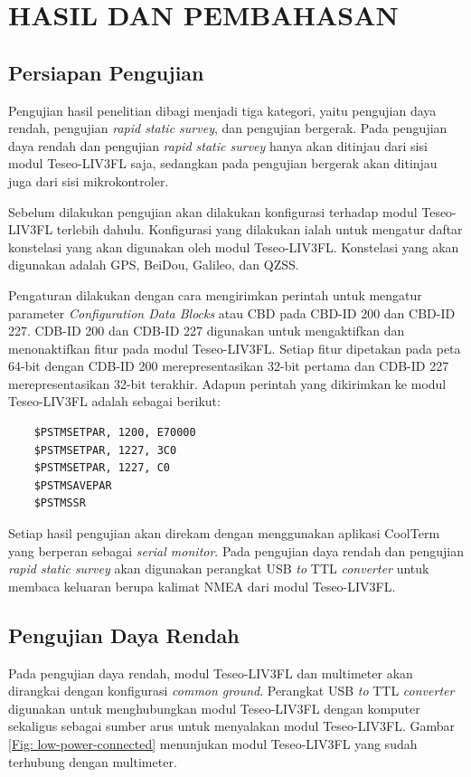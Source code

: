 \chapter{HASIL DAN PEMBAHASAN}

\section{Persiapan Pengujian}
Pengujian hasil penelitian dibagi menjadi tiga kategori, yaitu pengujian daya rendah, pengujian \textit{rapid static survey}, dan pengujian bergerak. Pada pengujian daya rendah dan pengujian \textit{rapid static survey} hanya akan ditinjau dari sisi modul Teseo-LIV3FL saja, sedangkan pada pengujian bergerak akan ditinjau juga dari sisi mikrokontroler.

Sebelum dilakukan pengujian akan dilakukan konfigurasi terhadap modul Teseo-LIV3FL terlebih dahulu. Konfigurasi yang dilakukan ialah untuk mengatur daftar konstelasi yang akan digunakan oleh modul Teseo-LIV3FL. Konstelasi yang akan digunakan adalah GPS, BeiDou, Galileo, dan QZSS.

Pengaturan dilakukan dengan cara mengirimkan perintah untuk mengatur parameter \textit{Configuration Data Blocks} atau CBD pada CBD-ID 200 dan CBD-ID 227. CDB-ID 200 dan CDB-ID 227 digunakan untuk mengaktifkan dan menonaktifkan fitur pada modul Teseo-LIV3FL. Setiap fitur dipetakan pada peta 64-bit dengan CDB-ID 200 merepresentasikan 32-bit pertama dan CDB-ID 227 merepresentasikan 32-bit terakhir. Adapun perintah yang dikirimkan ke modul Teseo-LIV3FL adalah sebagai berikut: 

\begin{verbatim}
	$PSTMSETPAR, 1200, E70000
	$PSTMSETPAR, 1227, 3C0
	$PSTMSETPAR, 1227, C0
	$PSTMSAVEPAR
	$PSTMSSR
\end{verbatim}

Setiap hasil pengujian akan direkam dengan menggunakan aplikasi CoolTerm yang berperan sebagai \textit{serial monitor}. Pada pengujian daya rendah dan pengujian \textit{rapid static survey} akan digunakan perangkat USB \textit{to} TTL \textit{converter} untuk membaca keluaran berupa kalimat NMEA dari modul Teseo-LIV3FL.

\section{Pengujian Daya Rendah}
Pada pengujian daya rendah, modul Teseo-LIV3FL dan multimeter akan dirangkai dengan konfigurasi \textit{common ground}. Perangkat USB \textit{to} TTL \textit{converter} digunakan untuk menghubungkan modul Teseo-LIV3FL dengan komputer sekaligus sebagai sumber arus untuk menyalakan modul Teseo-LIV3FL. Gambar \ref{Fig: low-power-connected} menunjukan modul Teseo-LIV3FL yang sudah terhubung dengan multimeter.


